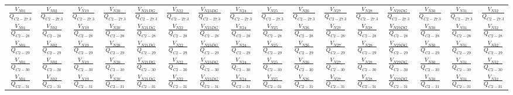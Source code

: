 \begin{table}[H]
{\begin{tabular}{cccccccccccccccc}
			
			$\frac{V_{N01}}{Q_{C 2-27.3}}$& $\frac{V_{N02}}{Q_{C 2-27.3}}$& $\frac{V_{N19}}{Q_{C 2-27.3}}$& $\frac{V_{N20}}{Q_{C 2-27.3}}$& $\frac{V_{N21 DG}}{Q_{C 2-27.3}}$& $\frac{V_{N22}}{Q_{C 2-27.3}}$& $\frac{V_{N23 DG}}{Q_{C 2-27.3}}$& $\frac{V_{N24}}{Q_{C 2-27.3}}$& $\frac{V_{N25}}{Q_{C 2-27.3}}$& $\frac{V_{N26}}{Q_{C 2-27.3}}$&$\frac{V_{N27}}{Q_{C 2-27.3}}$&$\frac{V_{N28}}{Q_{C 2-27.3}}$&$\frac{V_{N29 DG}}{Q_{C 2-27.3}}$&$\frac{V_{N30}}{Q_{C 2-27.3}}$&$\frac{V_{N31}}{Q_{C 2-27.3}}$&$\frac{V_{N32}}{Q_{C 2-27.3}}$\\
			
			$\frac{V_{N01}}{Q_{C 2-28}}$& $\frac{V_{N02}}{Q_{C 2-28}}$& $\frac{V_{N19}}{Q_{C 2-28}}$& $\frac{V_{N20}}{Q_{C 2-28}}$& $\frac{V_{N21 DG}}{Q_{C 2-28}}$& $\frac{V_{N22}}{Q_{C 2-28}}$& $\frac{V_{N23 DG}}{Q_{C 2-28}}$& $\frac{V_{N24}}{Q_{C 2-28}}$& $\frac{V_{N25}}{Q_{C 2-28}}$& $\frac{V_{N26}}{Q_{C 2-28}}$&$\frac{V_{N27}}{Q_{C 2-28}}$&$\frac{V_{N28}}{Q_{C 2-28}}$&$\frac{V_{N29 DG}}{Q_{C 2-28}}$&$\frac{V_{N30}}{Q_{C 2-28}}$&$\frac{V_{N31}}{Q_{C 2-28}}$&$\frac{V_{N32}}{Q_{C 2-28}}$\\
			
			$\frac{V_{N01}}{Q_{C 2-29}}$& $\frac{V_{N02}}{Q_{C 2-29}}$& $\frac{V_{N19}}{Q_{C 2-29}}$& $\frac{V_{N20}}{Q_{C 2-29}}$& $\frac{V_{N21 DG}}{Q_{C 2-29}}$& $\frac{V_{N22}}{Q_{C 2-29}}$& $\frac{V_{N23 DG}}{Q_{C 2-29}}$& $\frac{V_{N24}}{Q_{C 2-29}}$& $\frac{V_{N25}}{Q_{C 2-29}}$& $\frac{V_{N26}}{Q_{C 2-29}}$&$\frac{V_{N27}}{Q_{C 2-29}}$&$\frac{V_{N28}}{Q_{C 2-29}}$&$\frac{V_{N29 DG}}{Q_{C 2-29}}$&$\frac{V_{N30}}{Q_{C 2-29}}$&$\frac{V_{N31}}{Q_{C 2-29}}$&$\frac{V_{N32}}{Q_{C 2-29}}$\\
			
			$\frac{V_{N01}}{Q_{C 2-30}}$& $\frac{V_{N02}}{Q_{C 2-30}}$& $\frac{V_{N19}}{Q_{C 2-30}}$& $\frac{V_{N20}}{Q_{C 2-30}}$& $\frac{V_{N21 DG}}{Q_{C 2-30}}$& $\frac{V_{N22}}{Q_{C 2-30}}$& $\frac{V_{N23 DG}}{Q_{C 2-30}}$& $\frac{V_{N24}}{Q_{C 2-30}}$& $\frac{V_{N25}}{Q_{C 2-30}}$& $\frac{V_{N26}}{Q_{C 2-30}}$&$\frac{V_{N27}}{Q_{C 2-30}}$&$\frac{V_{N28}}{Q_{C 2-30}}$&$\frac{V_{N29 DG}}{Q_{C 2-30}}$&$\frac{V_{N30}}{Q_{C 2-30}}$&$\frac{V_{N31}}{Q_{C 2-30}}$&$\frac{V_{N32}}{Q_{C 2-30}}$\\
			
			$\frac{V_{N01}}{Q_{C 2-31}}$& $\frac{V_{N02}}{Q_{C 2-31}}$& $\frac{V_{N19}}{Q_{C 2-31}}$& $\frac{V_{N20}}{Q_{C 2-31}}$& $\frac{V_{N21 DG}}{Q_{C 2-31}}$& $\frac{V_{N22}}{Q_{C 2-31}}$& $\frac{V_{N23 DG}}{Q_{C 2-31}}$& $\frac{V_{N24}}{Q_{C 2-31}}$& $\frac{V_{N25}}{Q_{C 2-31}}$& $\frac{V_{N26}}{Q_{C 2-31}}$&$\frac{V_{N27}}{Q_{C 2-31}}$&$\frac{V_{N28}}{Q_{C 2-31}}$&$\frac{V_{N29 DG}}{Q_{C 2-31}}$&$\frac{V_{N30}}{Q_{C 2-31}}$&$\frac{V_{N31}}{Q_{C 2-31}}$&$\frac{V_{N32}}{Q_{C 2-31}}$\\
			

\end{tabular}}
\end{table}
